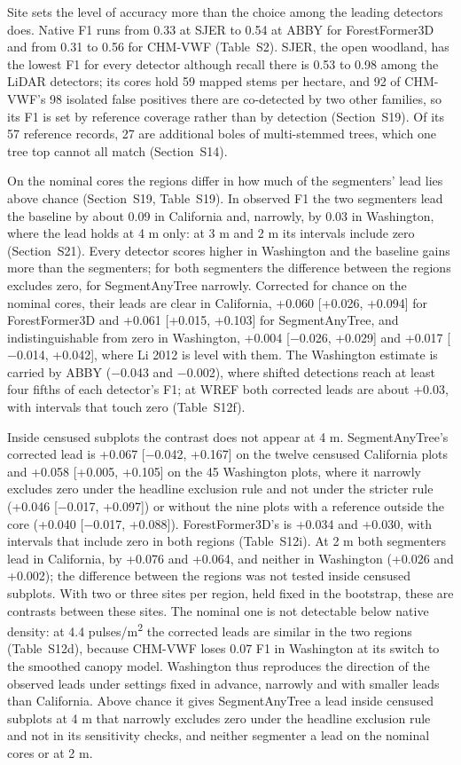 \documentclass[preprint,12pt,authoryear,a4paper]{elsarticle}
\begin{document}
Site sets the level of accuracy more than the choice among the leading detectors
does. Native F1 runs from 0.33 at SJER to 0.54 at ABBY for ForestFormer3D and
from 0.31 to 0.56 for CHM-VWF (Table~S2). SJER, the open woodland, has the
lowest F1 for every detector although recall there is 0.53 to 0.98 among the
LiDAR detectors; its cores hold 59 mapped stems per hectare, and 92 of CHM-VWF's
98 isolated false positives there are co-detected by two other families, so its
F1 is set by reference coverage rather than by detection (Section~S19). Of its
57 reference records, 27 are additional boles of multi-stemmed trees, which one
tree top cannot all match (Section~S14).

On the nominal cores the regions differ in how much of the segmenters' lead lies
above chance (Section~S19, Table~S19). In observed F1 the two segmenters lead
the baseline by about 0.09 in California and, narrowly, by 0.03 in Washington,
where the lead holds at 4 m only: at 3 m and 2 m its intervals include zero
(Section~S21). Every detector scores higher in Washington and the baseline gains
more than the segmenters; for both segmenters the difference between the regions
excludes zero, for SegmentAnyTree narrowly. Corrected for chance on the nominal
cores, their leads are clear in California, +0.060 [+0.026, +0.094] for
ForestFormer3D and +0.061 [+0.015, +0.103] for SegmentAnyTree, and
indistinguishable from zero in Washington, +0.004 [$-$0.026, +0.029] and +0.017
[$-$0.014, +0.042], where Li 2012 is level with them. The Washington estimate is
carried by ABBY ($-$0.043 and $-$0.002), where shifted detections reach at least
four fifths of each detector's F1; at WREF both corrected leads are about +0.03,
with intervals that touch zero (Table~S12f).

Inside censused subplots the contrast does not appear at 4 m. SegmentAnyTree's
corrected lead is +0.067 [$-$0.042, +0.167] on the twelve censused California
plots and +0.058 [+0.005, +0.105] on the 45 Washington plots, where it narrowly
excludes zero under the headline exclusion rule and not under the stricter rule
(+0.046 [$-$0.017, +0.097]) or without the nine plots with a reference outside the
core (+0.040 [$-$0.017, +0.088]). ForestFormer3D's is +0.034 and +0.030, with
intervals that include zero in both regions (Table~S12i). At 2 m both segmenters
lead in California, by +0.076 and +0.064, and neither in Washington (+0.026 and
+0.002); the difference between the regions was not tested inside censused
subplots. With two or three sites per region, held fixed in the bootstrap, these
are contrasts between these sites. The nominal one is not detectable below
native density: at 4.4 pulses/m\textsuperscript{2} the corrected leads are similar in the two
regions (Table~S12d), because CHM-VWF loses 0.07 F1 in Washington at its switch
to the smoothed canopy model. Washington thus reproduces the direction of the
observed leads under settings fixed in advance, narrowly and with smaller leads
than California. Above chance it gives SegmentAnyTree a lead inside censused
subplots at 4 m that narrowly excludes zero under the headline exclusion rule
and not in its sensitivity checks, and neither segmenter a lead on the nominal
cores or at 2 m.
\end{document}
